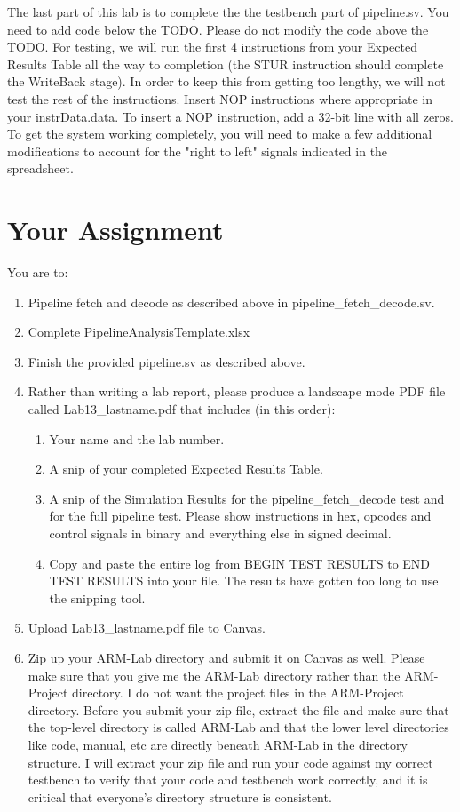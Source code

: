 The last part of this lab is to complete the the testbench part of pipeline.sv.  You need to add code below the TODO.  Please do not modify the code above the TODO. For testing, we will run the first 4 instructions from your Expected Results Table all the way to completion (the STUR instruction should complete the WriteBack stage).  In order to keep this from getting too lengthy, we will not test the rest of the instructions.  Insert NOP instructions where appropriate in your instrData.data.  To insert a NOP instruction, add a 32-bit line with all zeros.  To get the system working completely, you will need to make a few additional modifications to account for the "right to left" signals indicated in the spreadsheet.

\section{Your Assignment}

You are to:
\begin{enumerate}
\item Pipeline fetch and decode as described above in pipeline\_fetch\_decode.sv.
\item Complete PipelineAnalysisTemplate.xlsx
\item Finish the provided pipeline.sv as described above.
\item Rather than writing a lab report, please produce a landscape mode PDF file called Lab13\_lastname.pdf that includes (in this order):
\begin{enumerate}
	\item Your name and the lab number.
	\item A snip of your completed Expected Results Table.
	\item A snip of the Simulation Results for the pipeline\_fetch\_decode test and for the full pipeline test.  Please show instructions in hex, opcodes and control signals in binary and everything else in signed decimal.  
	\item Copy and paste the entire log from BEGIN TEST RESULTS to END TEST RESULTS into your file.  The results have gotten too long to use the snipping tool.	
\end{enumerate}
\item Upload Lab13\_lastname.pdf file to Canvas.
\item Zip up your ARM-Lab directory and submit it on Canvas as well.  Please make sure that you give me the ARM-Lab directory rather than the ARM-Project directory.  I do not want the project files in the ARM-Project directory.  Before you submit your zip file, extract the file and make sure that the top-level directory is called ARM-Lab and that the lower level directories like code, manual, etc are directly beneath ARM-Lab in the directory structure.  I will extract your zip file and run your code against my correct testbench to verify that your code and testbench work correctly, and it is critical that everyone's directory structure is consistent.
\end{enumerate} 